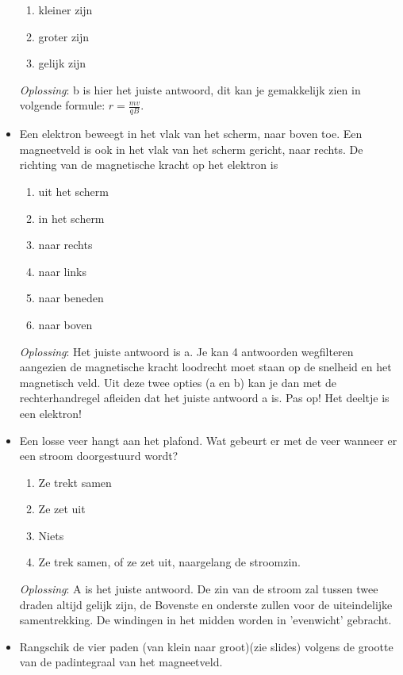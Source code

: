 \documentclass[12pt,a4paper]{article}
\begin{document}
\begin{itemize}
    	\begin{enumerate}[label=\alph*]
    		\item kleiner zijn
    		\item groter zijn 
    		\item gelijk zijn
    	\end{enumerate}
    	\textit{Oplossing}: b is hier het juiste antwoord, dit kan je gemakkelijk zien in volgende formule: \(r = \frac{mv}{qB}\).
    	\item Een elektron beweegt in het vlak van het scherm, naar boven toe. Een magneetveld is ook in het vlak van het scherm gericht, naar rechts. De richting van de magnetische kracht op het elektron is
    	\begin{enumerate}[label=\alph*]
    		\item uit het scherm
    		\item in het scherm
    		\item naar rechts
    		\item naar links
    		\item naar beneden 
    		\item naar boven
    	\end{enumerate}
    	\textit{Oplossing}: Het juiste antwoord is a. Je kan 4 antwoorden wegfilteren aangezien de magnetische kracht loodrecht moet staan op de snelheid en het magnetisch veld. Uit deze twee opties (a en b) kan je dan met de rechterhandregel afleiden dat het juiste antwoord a is. Pas op! Het deeltje is een elektron!
    	\item Een losse veer hangt aan het plafond. Wat gebeurt er met de veer wanneer er een stroom doorgestuurd wordt?
    	\begin{enumerate}[label=\alph*]
    		\item Ze trekt samen
    		\item Ze zet uit
    		\item Niets
    		\item Ze trek samen, of ze zet uit, naargelang de stroomzin.
    	\end{enumerate}
    	\textit{Oplossing}: A is het juiste antwoord. De zin van de stroom zal tussen twee draden altijd gelijk zijn, de Bovenste en onderste zullen voor de uiteindelijke samentrekking. De windingen in het midden worden in 'evenwicht' gebracht. 
    	\item Rangschik de vier paden (van klein naar groot)(zie slides) volgens de grootte van de padintegraal van het magneetveld.
    	\begin{enumerate}[label=\alph*]

\end{enumerate}
\end{itemize}
\end{document}
